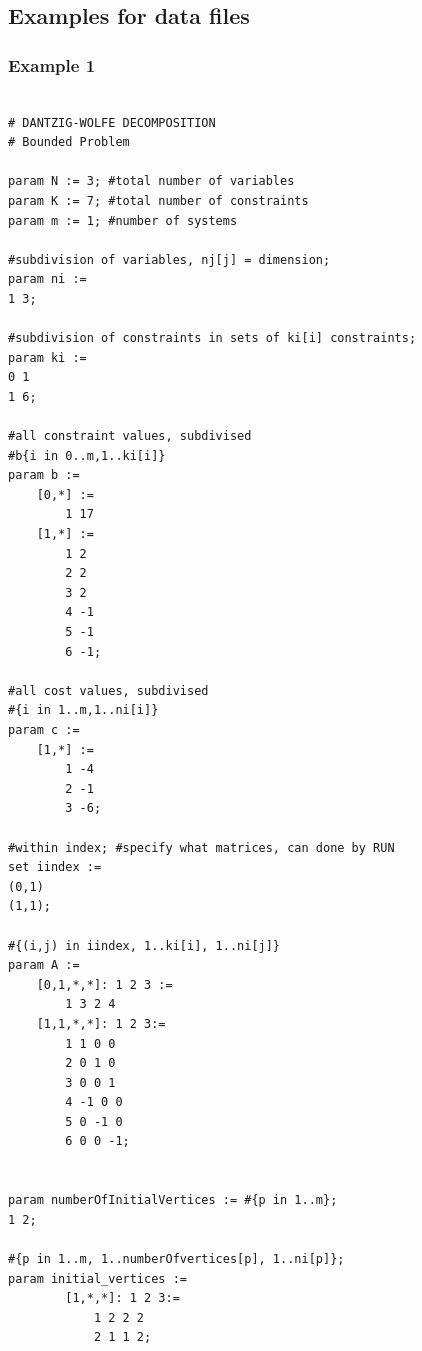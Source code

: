 \documentclass[a4paper,12pt]{article}
\begin{document}
\newpage
\subsection{Examples for data files}

\subsubsection{Example 1}
\begin{lstlisting}

# DANTZIG-WOLFE DECOMPOSITION
# Bounded Problem

param N := 3; #total number of variables
param K := 7; #total number of constraints
param m := 1; #number of systems 

#subdivision of variables, nj[j] = dimension;
param ni :=
1 3;

#subdivision of constraints in sets of ki[i] constraints;
param ki :=
0 1
1 6; 

#all constraint values, subdivised
#b{i in 0..m,1..ki[i]}
param b :=
	[0,*] :=
		1 17
	[1,*] :=
		1 2
		2 2
		3 2
		4 -1
		5 -1
		6 -1;

#all cost values, subdivised 
#{i in 1..m,1..ni[i]}
param c :=
	[1,*] :=
		1 -4
		2 -1
		3 -6;
		
#within index; #specify what matrices, can done by RUN
set iindex := 
(0,1)
(1,1);

#{(i,j) in iindex, 1..ki[i], 1..ni[j]}
param A := 
	[0,1,*,*]: 1 2 3 :=
		1 3 2 4
	[1,1,*,*]: 1 2 3:=
		1 1 0 0
		2 0 1 0
		3 0 0 1
		4 -1 0 0
		5 0 -1 0
		6 0 0 -1;
		
		
param numberOfInitialVertices := #{p in 1..m};
1 2;

#{p in 1..m, 1..numberOfvertices[p], 1..ni[p]}; 		
param initial_vertices := 
		[1,*,*]: 1 2 3:=
			1 2 2 2
			2 1 1 2;
\end{lstlisting}

\newpage
\end{document}

